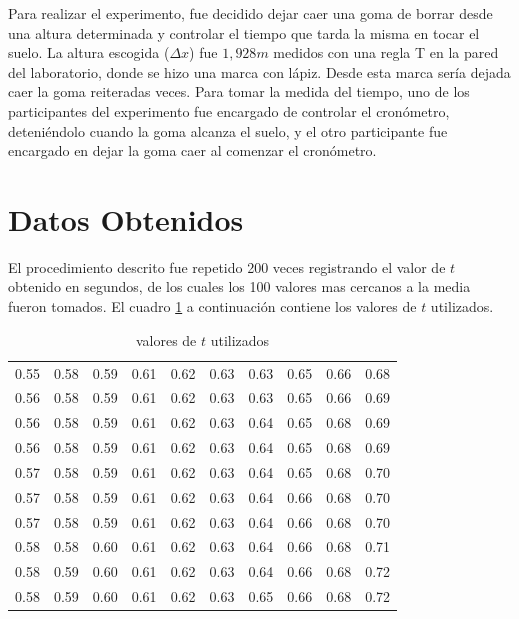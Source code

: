 \documentclass{article}
\begin{document}
Para realizar el experimento, fue decidido dejar caer una goma de borrar desde una altura determinada y controlar el tiempo que tarda la misma en tocar el suelo. La altura escogida ($\Delta x$) fue $1,928m$ medidos con una regla T en la pared del laboratorio, donde se hizo una marca con l\'{a}piz. Desde esta marca ser\'{i}a dejada caer la goma reiteradas veces. Para tomar la medida del tiempo, uno de los participantes del experimento fue encargado de controlar el cron\'{o}metro, deteniéndolo cuando la goma alcanza el suelo, y el otro participante fue encargado en dejar la goma caer al comenzar el cron\'{o}metro.

\section{Datos Obtenidos}

El procedimiento descrito fue repetido 200 veces registrando el valor de $t$ obtenido en segundos, de los cuales los 100 valores mas cercanos a la media fueron tomados. El cuadro \ref{table:tvalues} a continuaci\'{o}n contiene los valores de $t$ utilizados.

\begin{table}[h]
\centering
\begin{tabular}{llllllllll}
0.55 & 0.58 & 0.59 & 0.61 & 0.62 & 0.63 & 0.63 & 0.65 & 0.66 & 0.68  \\
0.56 & 0.58 & 0.59 & 0.61 & 0.62 & 0.63 & 0.63 & 0.65 & 0.66 & 0.69  \\
0.56 & 0.58 & 0.59 & 0.61 & 0.62 & 0.63 & 0.64 & 0.65 & 0.68 & 0.69  \\
0.56 & 0.58 & 0.59 & 0.61 & 0.62 & 0.63 & 0.64 & 0.65 & 0.68 & 0.69  \\
0.57 & 0.58 & 0.59 & 0.61 & 0.62 & 0.63 & 0.64 & 0.65 & 0.68 & 0.70   \\
0.57 & 0.58 & 0.59 & 0.61 & 0.62 & 0.63 & 0.64 & 0.66 & 0.68 & 0.70   \\
0.57 & 0.58 & 0.59 & 0.61 & 0.62 & 0.63 & 0.64 & 0.66 & 0.68 & 0.70   \\
0.58 & 0.58 & 0.60 & 0.61 & 0.62 & 0.63 & 0.64 & 0.66 & 0.68 & 0.71  \\
0.58 & 0.59 & 0.60 & 0.61 & 0.62 & 0.63 & 0.64 & 0.66 & 0.68 & 0.72  \\
0.58 & 0.59 & 0.60 & 0.61 & 0.62 & 0.63 & 0.65 & 0.66 & 0.68 & 0.72 
\end{tabular}
\caption{valores de $t$ utilizados}
\label{table:tvalues}
\end{table}
\end{document}
